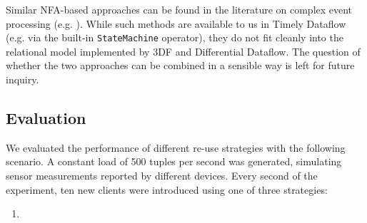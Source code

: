 \documentclass[../catalog.tex]{subfiles}
\begin{document}
Similar NFA-based approaches can be found in the literature on complex
event processing (e.g. \cite{agrawal2008}). While such methods are
available to us in Timely Dataflow (e.g. via the built-in
\texttt{StateMachine} operator), they do not fit cleanly into the
relational model implemented by 3DF and Differential Dataflow. The
question of whether the two approaches can be combined in a sensible
way is left for future inquiry.

\subsection{Evaluation}

We evaluated the performance of different re-use strategies with the
following scenario. A constant load of 500 tuples per second was
generated, simulating sensor measurements reported by different
devices. Every second of the experiment, ten new clients were
introduced using one of three strategies:

\begin{enumerate}
  \item 
\end{enumerate}
\end{document}
